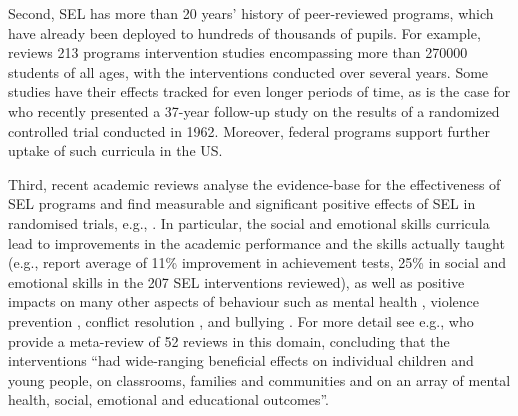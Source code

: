 \documentclass[prodmode,acmtochi]{acmsmall}
\newcommand{\rephrase}[1]{\textrm{\textrm{\textcolor{gray}{#1}}}}
\begin{document}
Second, SEL has more than 20 years' history of peer-reviewed programs, which have already been deployed to hundreds of thousands of pupils. For example,  reviews 213 programs intervention studies encompassing more than 270000 students of all ages, with the interventions conducted over several years. Some studies have their effects tracked for even longer periods of time, as is the case for  who recently presented a 37-year follow-up study on the results of a randomized controlled trial conducted in 1962. Moreover, federal programs support further uptake of such curricula in the US. 

Third, recent academic reviews analyse the evidence-base for the effectiveness of SEL programs and find measurable and significant positive effects of SEL in randomised trials, e.g., \cite{Durlak2011,Greenberg2010,Weare2011}. In particular, the social and emotional skills curricula lead to improvements in the academic performance and the skills actually taught (e.g.,   report average of 11\% improvement in achievement tests, 25\% in social and emotional skills in the 207 SEL interventions reviewed), as well as positive impacts on many other aspects of behaviour such as mental health \cite{Adi2007a}, violence prevention \cite{Mytton2006,Adi2007b}, conflict resolution \cite{Garrard2007},  and bullying \cite{Vreeman2007}. For more detail see e.g.,  who provide a meta-review of 52 reviews in this domain, concluding that the interventions ``had wide-ranging beneficial effects on individual children and young people, on classrooms, families and communities and on an array of mental health, social, emotional and educational outcomes''.


\end{document}
